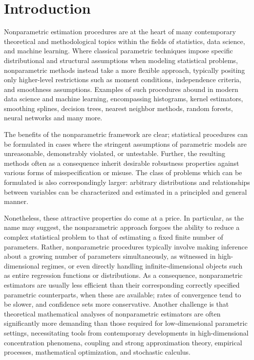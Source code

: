 
\chapter{Introduction}

Nonparametric estimation procedures are at the heart of many contemporary
theoretical and methodological topics within the fields of statistics, data
science, and machine learning. Where classical parametric techniques impose
specific distributional and structural assumptions when modeling statistical
problems, nonparametric methods instead take a more flexible approach,
typically positing only higher-level restrictions such as moment conditions,
independence criteria, and
smoothness assumptions. Examples of such procedures abound in
modern data science and machine learning,
encompassing histograms, kernel estimators, smoothing splines, decision trees,
nearest neighbor methods, random forests, neural networks and many more.

The benefits of the nonparametric framework are clear;
statistical procedures can be
formulated in cases where the stringent assumptions of parametric models are
unreasonable, demonstrably violated, or untestable.
Further, the resulting methods often as a consequence inherit desirable
robustness properties against various forms of misspecification or misuse. The
class of problems which can be formulated is also correspondingly larger:
arbitrary distributions and relationships between variables can be characterized
and estimated in a principled and general manner.

Nonetheless, these attractive properties do come at a price. In particular, as
the name may suggest, the nonparametric approach forgoes the ability to reduce a
complex statistical problem to that of estimating a fixed finite number of
parameters. Rather, nonparametric procedures typically involve
making inference about a
growing number of parameters simultaneously,
as witnessed in high-dimensional regimes,
or even directly handling
infinite-dimensional objects such as entire
regression functions or distributions. As a consequence,
nonparametric estimators are usually less efficient than their corresponding
correctly specified parametric counterparts, when these are available;
rates of convergence tend to be slower, and confidence sets more conservative.
Another challenge is that
theoretical mathematical analyses of nonparametric
estimators are often significantly more
demanding than those required for low-dimensional parametric settings,
necessitating tools from contemporary developments in high-dimensional
concentration phenomena,
coupling and strong approximation theory,
empirical processes,
mathematical optimization,
and stochastic calculus.

